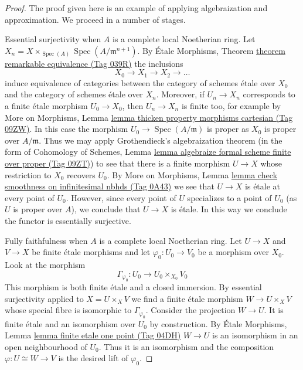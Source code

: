 \documentclass{amsart}
\theoremstyle{plain}
\theoremstyle{definition}
\theoremstyle{remark}
\numberwithin{equation}{subsection}
\def\Spec{\mathop{\mathrm{Spec}}}
\begin{document}
\begin{proof}
The proof given here is an example of applying algebraization and
approximation. We proceed in a number of stages.

\medskip\noindent
Essential surjectivity when $A$ is a complete local Noetherian ring.
Let $X_n = X \times_{\Spec(A)} \Spec(A/\mathfrak m^{n + 1})$.
By \'Etale Morphisms, Theorem \href{https://stacks.math.columbia.edu/tag/039R}{theorem remarkable equivalence (Tag 039R)}
the inclusions
$$
X_0 \to X_1 \to X_2 \to \ldots
$$
induce equivalence of categories between the category
of schemes \'etale over $X_0$ and the category of schemes
\'etale over $X_n$.
Moreover, if $U_n \to X_n$ corresponds to a finite \'etale
morphism $U_0 \to X_0$, then $U_n \to X_n$ is finite too, for example
by More on Morphisms, Lemma
\href{https://stacks.math.columbia.edu/tag/09ZW}{lemma thicken property morphisms cartesian (Tag 09ZW)}.
In this case the morphism $U_0 \to \Spec(A/\mathfrak m)$
is proper as $X_0$ is proper over $A/\mathfrak m$. Thus we may apply
Grothendieck's algebraization theorem
(in the form of
Cohomology of Schemes, Lemma
\href{https://stacks.math.columbia.edu/tag/09ZT}{lemma algebraize formal scheme finite over proper (Tag 09ZT)})
to see that there is a finite morphism $U \to X$ whose restriction
to $X_0$ recovers $U_0$. By More on Morphisms, Lemma
\href{https://stacks.math.columbia.edu/tag/0A43}{lemma check smoothness on infinitesimal nbhds (Tag 0A43)}
we see that $U \to X$ is \'etale at every point of $U_0$.
However, since every point of $U$ specializes to a point of $U_0$
(as $U$ is proper over $A$), we conclude that $U \to X$ is \'etale.
In this way we conclude the functor is essentially surjective.

\medskip\noindent
Fully faithfulness when $A$ is a complete local Noetherian ring.
Let $U \to X$ and $V \to X$ be finite \'etale morphisms and
let $\varphi_0 : U_0 \to V_0$ be a morphism over $X_0$. Look at
the morphism
$$
\Gamma_{\varphi_0} : U_0 \longrightarrow U_0 \times_{X_0} V_0
$$
This morphism is both finite \'etale and a closed immersion.
By essential surjectivity applied to $X = U \times_X V$ we find
a finite \'etale morphism $W \to U \times_X V$ whose special
fibre is isomorphic to $\Gamma_{\varphi_0}$. Consider the projection
$W \to U$. It is finite \'etale and an isomorphism over $U_0$ by
construction. By \'Etale Morphisms, Lemma
\href{https://stacks.math.columbia.edu/tag/04DH}{lemma finite etale one point (Tag 04DH)}
$W \to U$ is an isomorphism in an open neighbourhood of $U_0$.
Thus it is an isomorphism and the composition $\varphi : U \cong W \to V$
is the desired lift of $\varphi_0$.


\end{proof}
\end{document}
